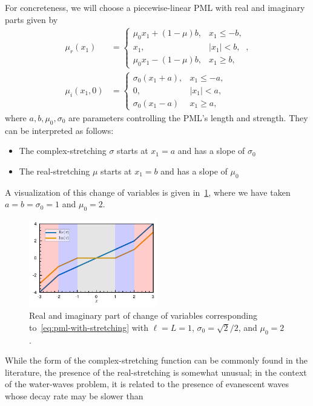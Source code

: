 \documentclass[11pt]{article}
\begin{document}
For concreteness, we will choose a piecewise-linear PML with real and imaginary
parts given by
\begin{align}
\label{eq:pml-with-stretching}  
  \mu_r(x_1) &= \begin{cases}
      \mu_0 x_1 + (1-\mu)b, & x_1 \leq -b,\\  
      x_1, & |x_1| < b, \\
      \mu_0 x_1 - (1-\mu)b, & x_1 \geq b, 
  \end{cases}, \\
  \mu_i(x_1,0) &= \begin{cases}
      \sigma_0 (x_1+a), & x_1 \leq -a, \\
      0, & |x_1| < a, \\
      \sigma_0 (x_1 - a) & x_1 \geq a,
  \end{cases}
\end{align}
where $a,b,\mu_0, \sigma_0$ are parameters controlling the PML's length and
strength. They can be interpreted as follows:
\begin{itemize}
  \item The complex-stretching $\sigma$ starts at $x_1 = a$ and has a slope of
  $\sigma_0$
  \item The real-stretching $\mu$ starts at $x_1 = b$ and has a slope of $\mu_0$
\end{itemize}
A visualization of this change of variables is given
in~\cref{fig:pml-with-stretching}, where we have taken $a=b=\sigma_0=1$ and
$\mu_0 = 2$.
\begin{figure}
  \centering
  \includegraphics[width=0.5\textwidth]{figures/pml_real_and_imag.pdf}
  \caption{Real and imaginary part of change of variables corresponding
  to~\cref{eq:pml-with-stretching} with $\ell = L = 1$, $\sigma_0 = \sqrt{2}/2$,
  and $\mu_0 = 2$.}
  \label{fig:pml-with-stretching}
\end{figure}

While the form of the complex-stretching function can be commonly found in the
literature, the presence of the real-stretching is somewhat unusual; in the
context of the water-waves problem, it is related to the presence of evanescent
waves whose decay rate may be slower than  
\end{document}
